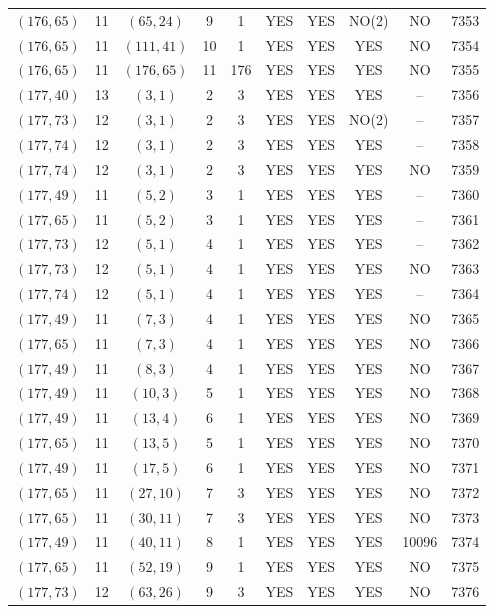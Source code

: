 \begin{longtable}{|c|c|c|c|c|c|c|c|c|c|}
$(176, 65)$ & 11 & $(65, 24)$ & 9 & 1 & YES & YES & NO(2) & NO & 7353\\
$(176, 65)$ & 11 & $(111, 41)$ & 10 & 1 & YES & YES & YES & NO & 7354\\
$(176, 65)$ & 11 & $(176, 65)$ & 11 & 176 & YES & YES & YES & NO & 7355\\
$(177, 40)$ & 13 & $(3, 1)$ & 2 & 3 & YES & YES & YES & -- & 7356\\
$(177, 73)$ & 12 & $(3, 1)$ & 2 & 3 & YES & YES & NO(2) & -- & 7357\\
$(177, 74)$ & 12 & $(3, 1)$ & 2 & 3 & YES & YES & YES & -- & 7358\\
$(177, 74)$ & 12 & $(3, 1)$ & 2 & 3 & YES & YES & YES & NO & 7359\\
$(177, 49)$ & 11 & $(5, 2)$ & 3 & 1 & YES & YES & YES & -- & 7360\\
$(177, 65)$ & 11 & $(5, 2)$ & 3 & 1 & YES & YES & YES & -- & 7361\\
$(177, 73)$ & 12 & $(5, 1)$ & 4 & 1 & YES & YES & YES & -- & 7362\\
$(177, 73)$ & 12 & $(5, 1)$ & 4 & 1 & YES & YES & YES & NO & 7363\\
$(177, 74)$ & 12 & $(5, 1)$ & 4 & 1 & YES & YES & YES & -- & 7364\\
$(177, 49)$ & 11 & $(7, 3)$ & 4 & 1 & YES & YES & YES & NO & 7365\\
$(177, 65)$ & 11 & $(7, 3)$ & 4 & 1 & YES & YES & YES & NO & 7366\\
$(177, 49)$ & 11 & $(8, 3)$ & 4 & 1 & YES & YES & YES & NO & 7367\\
$(177, 49)$ & 11 & $(10, 3)$ & 5 & 1 & YES & YES & YES & NO & 7368\\
$(177, 49)$ & 11 & $(13, 4)$ & 6 & 1 & YES & YES & YES & NO & 7369\\
$(177, 65)$ & 11 & $(13, 5)$ & 5 & 1 & YES & YES & YES & NO & 7370\\
$(177, 49)$ & 11 & $(17, 5)$ & 6 & 1 & YES & YES & YES & NO & 7371\\
$(177, 65)$ & 11 & $(27, 10)$ & 7 & 3 & YES & YES & YES & NO & 7372\\
$(177, 65)$ & 11 & $(30, 11)$ & 7 & 3 & YES & YES & YES & NO & 7373\\
$(177, 49)$ & 11 & $(40, 11)$ & 8 & 1 & YES & YES & YES & 10096 & 7374\\
$(177, 65)$ & 11 & $(52, 19)$ & 9 & 1 & YES & YES & YES & NO & 7375\\
$(177, 73)$ & 12 & $(63, 26)$ & 9 & 3 & YES & YES & YES & NO & 7376\\

\end{longtable}
